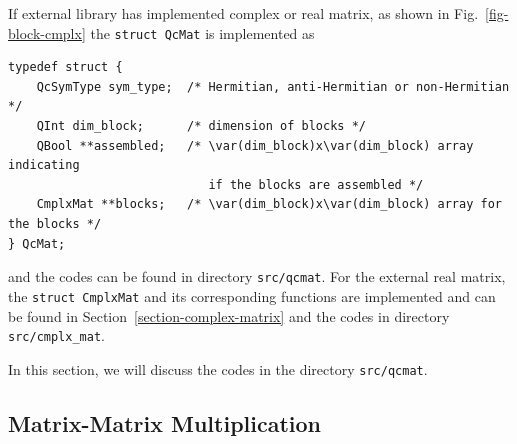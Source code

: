 \documentclass[a4paper,11pt,twoside,openright]{book}
\begin{document}
If external library has implemented complex or real matrix, as shown in Fig.~\ref{fig-block-cmplx}
the \verb|struct QcMat| is implemented as
\begin{verbatim}
typedef struct {
    QcSymType sym_type;  /* Hermitian, anti-Hermitian or non-Hermitian */
    QInt dim_block;      /* dimension of blocks */
    QBool **assembled;   /* \var(dim_block)x\var(dim_block) array indicating
                            if the blocks are assembled */
    CmplxMat **blocks;   /* \var(dim_block)x\var(dim_block) array for the blocks */
} QcMat;
\end{verbatim}
and the codes can be found in directory \verb|src/qcmat|. For the external real matrix,
the \verb|struct CmplxMat| and its corresponding functions are implemented and can be
found in Section~\ref{section-complex-matrix} and the codes in directory \verb|src/cmplx_mat|.

In this section, we will discuss the codes in the directory \verb|src/qcmat|.

\subsection{Matrix-Matrix Multiplication}
\label{section-block-GEMM}
\end{document}
